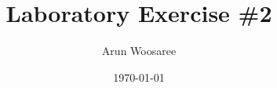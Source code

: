 \documentclass[letterpaper]{article}
\author{Arun Woosaree}
\date{\today}
\title{Laboratory Exercise \#2}
\begin{document}
\maketitle
\begin{center}

\end{center}
\end{document}

